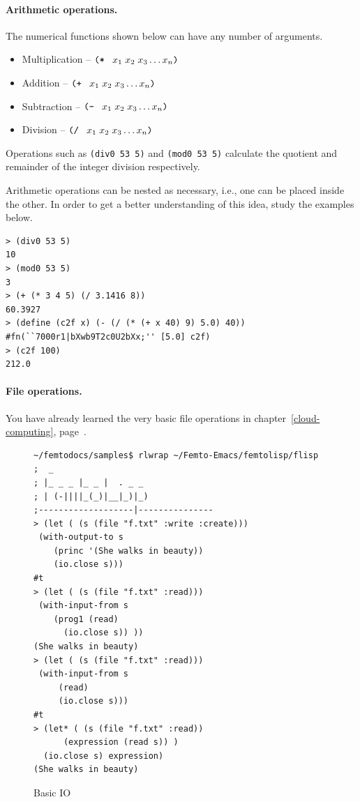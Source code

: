 \documentclass[a4paper,12pt]{book}
\newenvironment{fmpage}[1]
           {\begin{lrbox}{\fmbox}\begin{minipage}{#1}}
           {\end{minipage}\end{lrbox}\fbox{\usebox{\fmbox}}}
\begin{document}
\paragraph{Arithmetic operations.} The numerical functions
shown below can have any number of arguments.
\begin{itemize}
\item Multiplication -- $\verb|(* |\;x_1\; x_2\; x_3\ldots x_n\verb|)|$
\item Addition -- $\verb|(+ |\;x_1\; x_2\; x_3\ldots x_n\verb|)|$
\item Subtraction -- $\verb|(- |\;x_1\; x_2\; x_3\ldots x_n\verb|)|$
\item Division -- $\verb|(/ |\;x_1\; x_2\; x_3\ldots x_n\verb|)|$
\end{itemize}
Operations such as \verb|(div0 53 5)| and \verb|(mod0 53 5)|
calculate the quotient and remainder of the integer
division respectively. 

Arithmetic operations can
be nested as necessary, i.e., one
 can be placed inside the other.
In order to get a better understanding
of this idea, study the examples below.
\begin{Verbatim}[fontsize=\small,
frame=single]
> (div0 53 5)
10
> (mod0 53 5)
3
> (+ (* 3 4 5) (/ 3.1416 8))
60.3927
> (define (c2f x) (- (/ (* (+ x 40) 9) 5.0) 40))
#fn(``7000r1|bXwb9T2c0U2bXx;'' [5.0] c2f)
> (c2f 100)
212.0
\end{Verbatim}

\paragraph{File operations.}
You have already learned the very basic
file operations in chapter~\ref{cloud-computing},
page~\pageref{cloud-computing}.\\


\begin{figure}[!h]
\begin{fmpage}{0.95\textwidth}
\begin{verbatim}
~/femtodocs/samples$ rlwrap ~/Femto-Emacs/femtolisp/flisp
;  _
; |_ _ _ |_ _ |  . _ _
; | (-||||_(_)|__|_)|_)
;-------------------|---------------
> (let ( (s (file "f.txt" :write :create)))
 (with-output-to s
    (princ '(She walks in beauty))
    (io.close s)))
#t
> (let ( (s (file "f.txt" :read)))
 (with-input-from s
    (prog1 (read)
      (io.close s)) ))
(She walks in beauty)
> (let ( (s (file "f.txt" :read)))
 (with-input-from s
     (read)
     (io.close s)))
#t
> (let* ( (s (file "f.txt" :read))
      (expression (read s)) )
  (io.close s) expression)
(She walks in beauty)
\end{verbatim}
\end{fmpage}
\caption{Basic IO}
\label{basicio}
\end{figure}
\end{document}
